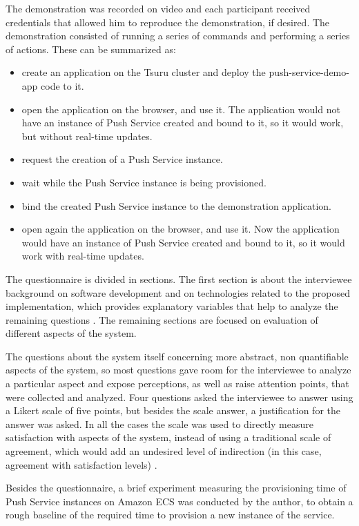 The demonstration was recorded on video and each participant received credentials that allowed him to reproduce the demonstration, if desired. The demonstration consisted of running a series of commands and performing a series of actions. These can be summarized as:
\begin{itemize}
    \item create an application on the Tsuru cluster and deploy the push-service-demo-app code to it.
    \item open the application on the browser, and use it. The application would not have an instance of Push Service created and bound to it, so it would work, but without real-time updates.
    \item request the creation of a Push Service instance.
    \item wait while the Push Service instance is being provisioned.
    \item bind the created Push Service instance to the demonstration application.
    \item open again the application on the browser, and use it. Now the application would have an instance of Push Service created and bound to it, so it would work with real-time updates.
\end{itemize}

The questionnaire is divided in sections. The first section is about the interviewee background on software development and on technologies related to the proposed implementation, which provides explanatory variables that help to analyze the remaining questions \cite{valli2017creating}. The remaining sections are focused on evaluation of different aspects of the system.

The questions about the system itself concerning more abstract, non quantifiable aspects of the system, so most questions gave room for the interviewee to analyze a particular aspect and expose perceptions, as well as raise attention points, that were collected and analyzed. Four questions asked the interviewee to answer using a Likert scale of five points, but besides the scale answer, a justification for the answer was asked. In all the cases the scale was used to directly measure satisfaction with aspects of the system, instead of using a traditional scale of agreement, which would add an undesired level of indirection (in this case, agreement with satisfaction levels) \cite{silva2014measurement}.

Besides the questionnaire, a brief experiment measuring the provisioning time of Push Service instances on Amazon ECS was conducted by the author, to obtain a rough baseline of the required time to provision a new instance of the service.
